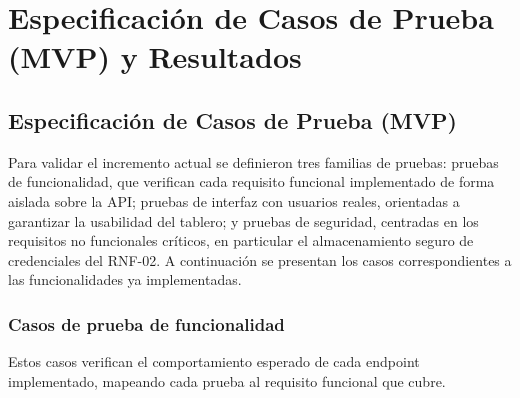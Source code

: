 \chapter{Especificación de Casos de Prueba (MVP) y Resultados}

\section{Especificación de Casos de Prueba (MVP)}
Para validar el incremento actual se definieron tres familias de pruebas: pruebas de funcionalidad, que verifican cada requisito funcional implementado de forma aislada sobre la API; pruebas de interfaz con usuarios reales, orientadas a garantizar la usabilidad del tablero; y pruebas de seguridad, centradas en los requisitos no funcionales críticos, en particular el almacenamiento seguro de credenciales del RNF-02. A continuación se presentan los casos correspondientes a las funcionalidades ya implementadas.

\subsection{Casos de prueba de funcionalidad}
Estos casos verifican el comportamiento esperado de cada endpoint implementado, mapeando cada prueba al requisito funcional que cubre.

